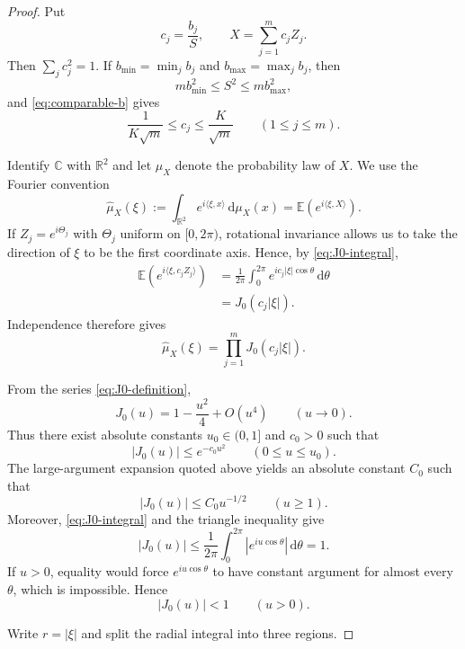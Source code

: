 \documentclass[11pt]{article}
\theoremstyle{definition}
\newcommand{\C}{\mathbb C}
\newcommand{\R}{\mathbb R}
\newcommand{\dd}{\,\mathrm d}
\newcommand{\1}{\mathbf 1}
\begin{document}
\begin{proof}
Put
\[
c_j=\frac{b_j}{S},
\qquad
X=\sum_{j=1}^m c_jZ_j.
\]
Then $\sum_jc_j^2=1$.  If $b_{\min}=\min_jb_j$ and $b_{\max}=\max_jb_j$, then
\[
mb_{\min}^2\le S^2\le mb_{\max}^2,
\]
and \eqref{eq:comparable-b} gives
\begin{equation}\label{eq:cj-comparable}
\frac{1}{K\sqrt m}\le c_j\le\frac{K}{\sqrt m}
\qquad(1\le j\le m).
\end{equation}

Identify $\C$ with $\R^2$ and let $\mu_X$ denote the probability law of $X$.  We use the Fourier convention
\[
\widehat\mu_X(\xi)
:=\int_{\R^2}e^{i\langle\xi,x\rangle}\dd\mu_X(x)
=\mathbb E\left(e^{i\langle\xi,X\rangle}\right).
\]
If $Z_j=e^{i\Theta_j}$ with $\Theta_j$ uniform on $[0,2\pi)$, rotational invariance allows us to take the direction of $\xi$ to be the first coordinate axis.  Hence, by \eqref{eq:J0-integral},
\begin{align*}
\mathbb E\left(e^{i\langle\xi,c_jZ_j\rangle}\right)
&=\frac1{2\pi}\int_0^{2\pi}
 e^{ic_j|\xi|\cos\theta}\dd\theta\\
&=J_0(c_j|\xi|).
\end{align*}
Independence therefore gives
\begin{equation}\label{eq:char-product}
\widehat\mu_X(\xi)
=\prod_{j=1}^mJ_0(c_j|\xi|).
\end{equation}

From the series \eqref{eq:J0-definition},
\[
J_0(u)=1-\frac{u^2}{4}+O(u^4)
\qquad(u\to0).
\]
Thus there exist absolute constants $u_0\in(0,1]$ and $c_0>0$ such that
\begin{equation}\label{eq:J0-small}
|J_0(u)|\le e^{-c_0u^2}
\qquad(0\le u\le u_0).
\end{equation}
The large-argument expansion quoted above yields an absolute constant $C_0$ such that
\begin{equation}\label{eq:J0-large}
|J_0(u)|\le C_0u^{-1/2}
\qquad(u\ge1).
\end{equation}
Moreover, \eqref{eq:J0-integral} and the triangle inequality give
\[
|J_0(u)|
\le\frac1{2\pi}\int_0^{2\pi}|e^{iu\cos\theta}|\dd\theta
=1.
\]
If $u>0$, equality would force $e^{iu\cos\theta}$ to have constant argument for almost every $\theta$, which is impossible.  Hence
\begin{equation}\label{eq:J0-strict}
|J_0(u)|<1\qquad(u>0).
\end{equation}

Write $r=|\xi|$ and split the radial integral into three regions.


\end{proof}
\end{document}
